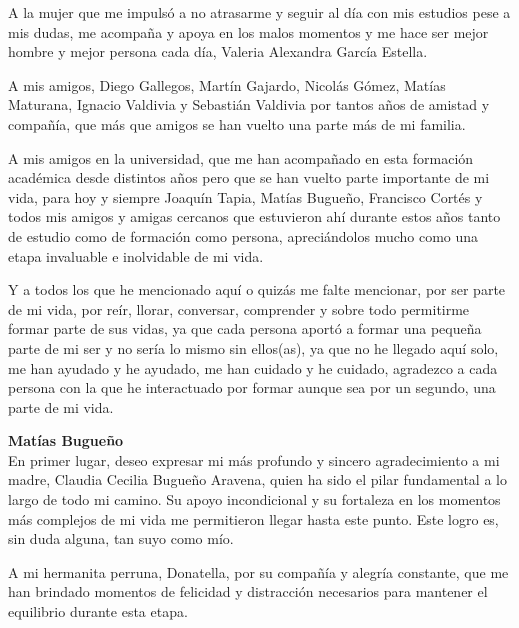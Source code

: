 \begin{small}
    A la mujer que me impulsó a no atrasarme y seguir al día con mis estudios pese a mis dudas, me acompaña y apoya en los malos momentos y me hace ser mejor hombre y mejor persona cada día, Valeria Alexandra García Estella.

    A mis amigos, Diego Gallegos, Martín Gajardo, Nicolás Gómez, Matías Maturana, Ignacio Valdivia y Sebastián Valdivia por tantos años de amistad y compañía, que más que amigos se han vuelto una parte más de mi familia.

    A mis amigos en la universidad, que me han acompañado en esta formación académica desde distintos años pero que se han vuelto parte importante de mi vida, para hoy y siempre Joaquín Tapia, Matías Bugueño, Francisco Cortés y todos mis amigos y amigas cercanos que estuvieron ahí durante estos años tanto de estudio como de formación como persona, apreciándolos mucho como una etapa invaluable e inolvidable de mi vida.

    Y a todos los que he mencionado aquí o quizás me falte mencionar, por ser parte de mi vida, por reír, llorar, conversar, comprender y sobre todo permitirme formar parte de sus vidas, ya que cada persona aportó a formar una pequeña parte de mi ser y no sería lo mismo sin ellos(as), ya que no he llegado aquí solo, me han ayudado y he ayudado, me han cuidado y he cuidado, agradezco a cada persona con la que he interactuado por formar aunque sea por un segundo, una parte de mi vida.

    \vspace{1em} %

    \noindent\textbf{Matías Bugueño} \\
    \nopagebreak
    \indent En primer lugar, deseo expresar mi más profundo y sincero agradecimiento a mi madre, Claudia Cecilia Bugueño Aravena, quien ha sido el pilar fundamental a lo largo de todo mi camino. Su apoyo incondicional y su fortaleza en los momentos más complejos de mi vida me permitieron llegar hasta este punto. Este logro es, sin duda alguna, tan suyo como mío.

    A mi hermanita perruna, Donatella, por su compañía y alegría constante, que me han brindado momentos de felicidad y distracción necesarios para mantener el equilibrio durante esta etapa.


\end{small}
